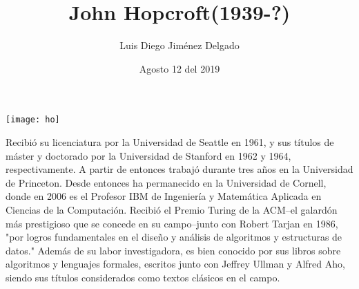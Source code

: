 \documentclass[12pt]{article}
\title{John Hopcroft(1939-?)}
\author{Luis Diego Jiménez Delgado}
\date{Agosto 12 del 2019}
\begin{document}
\maketitle

\begin{center}
\texttt{[image: ho]}
\end{center}
Recibió su licenciatura por la Universidad de Seattle en 1961, y sus títulos de máster y doctorado por la Universidad de Stanford en 1962 y 1964, respectivamente. A partir de entonces trabajó durante tres años en la Universidad de Princeton. Desde entonces ha permanecido en la Universidad de Cornell, donde en 2006 es el Profesor IBM de Ingeniería y Matemática Aplicada en Ciencias de la Computación.
Recibió el Premio Turing de la ACM--el galardón más prestigioso que se concede en su campo--junto con Robert Tarjan en 1986, "por logros fundamentales en el diseño y análisis de algoritmos y estructuras de datos." Además de su labor investigadora, es bien conocido por sus libros sobre algoritmos y lenguajes formales, escritos junto con Jeffrey Ullman y Alfred Aho, siendo sus títulos considerados como textos clásicos en el campo.
\end{document}
